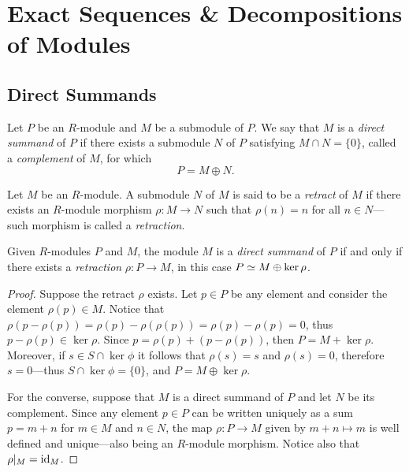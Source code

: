 \section{Exact Sequences \& Decompositions of Modules}

\subsection{Direct Summands}

\begin{definition}
    \label{def:direct-summand}
    Let \(P\) be an \(R\)-module and \(M\) be a submodule of \(P\). We say that
    \(M\) is a \emph{direct summand} of \(P\) if there exists a submodule \(N\) of
    \(P\) satisfying \(M \cap N = \{0\}\), called a \emph{complement} of \(M\), for
    which
    \[
        P = M \oplus N.
    \]
\end{definition}

\begin{definition}[Retract]
    \label{def:retract-module}
    Let \(M\) be an \(R\)-module. A submodule \(N\) of \(M\) is said to be a
    \emph{retract} of \(M\) if there exists an \(R\)-module morphism
    \(\rho: M \to N\) such that \(\rho(n) = n\) for all \(n \in N\)---such
    morphism is called a \emph{retraction}.
\end{definition}

\begin{proposition}
    \label{prop:direct-summand-iff-retraction}
    Given \(R\)-modules \(P\) and \(M\), the module \(M\) is a \emph{direct summand}
    of \(P\) if and only if there exists a \emph{retraction} \(\rho: P \to M\), in
    this case \(P \simeq M \oplus \ker \rho\).
\end{proposition}

\begin{proof}
    Suppose the retract \(\rho\) exists. Let \(p \in P\) be any element and consider
    the element \(\rho(p) \in M\). Notice that
    \(\rho(p - \rho(p)) = \rho(p) - \rho(\rho(p)) = \rho(p) - \rho(p) = 0\), thus
    \(p - \rho(p) \in \ker \rho\). Since \(p = \rho(p) + (p - \rho(p))\), then
    \(P = M + \ker \rho\). Moreover, if \(s \in S \cap \ker \phi\) it follows that
    \(\rho(s) = s\) and \(\rho(s) = 0\), therefore \(s = 0\)---thus
    \(S \cap \ker \phi = \{0\}\), and \(P = M \oplus \ker \rho\).

    For the converse, suppose that \(M\) is a direct summand of \(P\) and let \(N\)
    be its complement. Since any element \(p \in P\) can be written uniquely as a
    sum \(p = m + n\) for \(m \in M\) and \(n \in N\), the map \(\rho: P \to M\)
    given by \(m + n \mapsto m\) is well defined and unique---also being an
    \(R\)-module morphism. Notice also that \(\rho|_M = \operatorname{id}_M\).
\end{proof}

